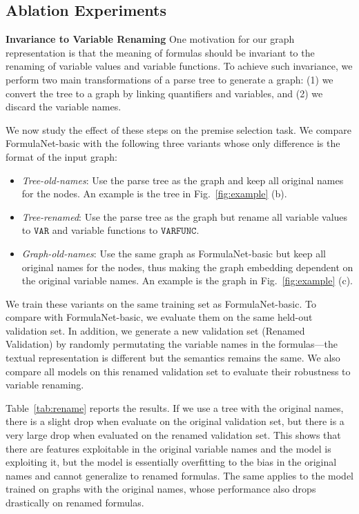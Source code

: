 \documentclass{article}
\begin{document}
\subsection{Ablation Experiments}

\noindent \textbf{Invariance to Variable Renaming} One motivation for our graph representation is that the meaning of formulas should be invariant to
the renaming of variable values and variable functions. To achieve such invariance, we perform
two main transformations of a parse tree to generate a graph: (1) we convert
the tree to a graph by linking quantifiers and variables, and (2) we discard the variable names.

We now study the effect of these steps on the premise selection task. 
We compare FormulaNet-basic with the following three variants whose only difference is the
 format of the input graph: 
\begin{itemize} 
	\item \emph{Tree-old-names}: Use the parse tree as the graph and keep all original 
          names for the nodes. An example is the tree in Fig.~\ref{fig:example} (b). 
	\item \emph{Tree-renamed}:  Use the parse tree as the graph but rename all 
          variable values to $\mathtt{VAR}$ and variable functions to $\mathtt{VARFUNC}$.
	\item \emph{Graph-old-names}: Use the same graph as FormulaNet-basic but keep all
          original names for the nodes, thus making the graph embedding dependent on the original
          variable names. An example is the graph in Fig.~\ref{fig:example} (c). 
\end{itemize}
We train these variants on the same training set as FormulaNet-basic. To compare with
FormulaNet-basic, we evaluate them on the same held-out validation set. In addition, we generate
a new validation set (Renamed Validation) by randomly permutating the variable names in
the formulas---the textual representation is different but the semantics remains the
same. We also compare all models on this renamed validation set to evaluate their
robustness to variable renaming.

Table~\ref{tab:rename} reports the results. If we use a tree
with the original names, there is a slight drop when evaluate on the original validation
set, but there is a very large drop when evaluated on the renamed validation set. This
shows that there are features exploitable in the original variable names and the
model is exploiting it, but the model is essentially overfitting to the bias in the
original names and cannot generalize to renamed formulas. The same applies to the model trained on graphs with the
original names, whose performance also drops drastically on renamed formulas. 
\end{document}
